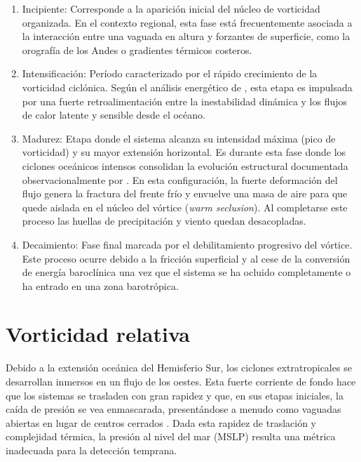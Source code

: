 \begin{enumerate}
    \item Incipiente: Corresponde a la aparición inicial del núcleo de vorticidad organizada. En el contexto regional, esta fase está frecuentemente asociada a la interacción entre una vaguada en altura y forzantes de superficie, como la orografía de los Andes o gradientes térmicos costeros.    
    \item Intensificación: Período caracterizado por el rápido crecimiento de la vorticidad ciclónica. Según el análisis energético de \citet{coutodesouza2024thesis}, esta etapa es impulsada por una fuerte retroalimentación entre la inestabilidad dinámica y los flujos de calor latente y sensible desde el océano.    
    \item Madurez: Etapa donde el sistema alcanza su intensidad máxima (pico de vorticidad) y su mayor extensión horizontal. Es durante esta fase donde los ciclones oceánicos intensos consolidan la evolución estructural documentada observacionalmente por \citet{shapiro1999bridge}. En esta configuración, la fuerte deformación del flujo genera la fractura del frente frío y envuelve una masa de aire para que quede aislada en el núcleo del vórtice (\textit{warm seclusion}). Al completarse este proceso las huellas de precipitación y viento quedan desacopladas.  
    \item Decaimiento: Fase final marcada por el debilitamiento progresivo del vórtice. Este proceso ocurre debido a la fricción superficial y al cese de la conversión de energía baroclínica una vez que el sistema se ha ocluido completamente o ha entrado en una zona barotrópica.
\end{enumerate}


\section{Vorticidad relativa}\label{sec:tb_vorticidad}
Debido a la extensión oceánica del Hemisferio Sur, los ciclones extratropicales se desarrollan inmersos en un flujo de los oestes. Esta fuerte corriente de fondo hace que los sistemas se trasladen con gran rapidez y que, en sus etapas iniciales, la caída de presión se vea enmascarada, presentándose a menudo como vaguadas abiertas en lugar de centros cerrados \citep{sinclair1994objective}. Dada esta rapidez de traslación y complejidad térmica, la presión al nivel del mar (MSLP) resulta una métrica inadecuada para la detección temprana. 

